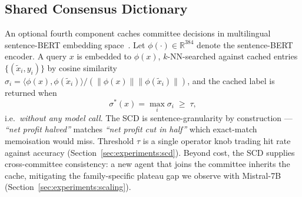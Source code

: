 \subsection{Shared Consensus Dictionary}
\label{sec:framework:scd}

An optional fourth component caches committee decisions in
multilingual sentence-BERT embedding
space~\cite{reimers2019sbert,reimers2020multilingualkd}. Let
$\phi(\cdot)\in\mathbb{R}^{384}$ denote the sentence-BERT encoder. A
query $x$ is embedded to $\phi(x)$, $k$-NN-searched against cached
entries $\{(\tilde{x}_i, y_i)\}$ by cosine similarity
$\sigma_i = \langle\phi(x),\phi(\tilde{x}_i)\rangle / (\|\phi(x)\|\|\phi(\tilde{x}_i)\|)$,
and the cached label is returned when
\begin{equation}
\label{eq:scdrule}
\sigma^{\ast}(x) = \max_{i} \sigma_i \;\ge\; \tau,
\end{equation}
i.e.\ \emph{without any model call}. The SCD is sentence-granularity
by construction --- \emph{``net profit halved''} matches
\emph{``net profit cut in half''} which exact-match memoisation
would miss. Threshold $\tau$ is a single operator knob trading hit
rate against accuracy (Section~\ref{sec:experiments:scd}). Beyond
cost, the SCD supplies cross-committee consistency: a new agent that
joins the committee inherits the cache, mitigating the
family-specific plateau gap we observe with Mistral-7B
(Section~\ref{sec:experiments:scaling}).
